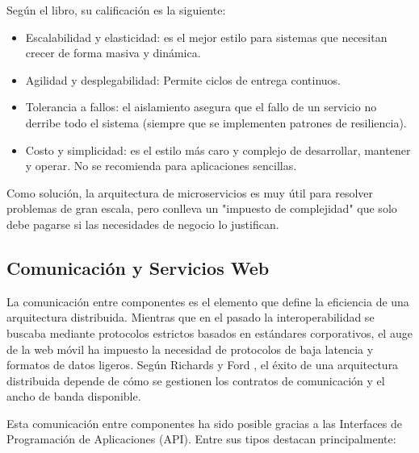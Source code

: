 \begin{itemize}
    Según el libro, su calificación es la siguiente:

    \begin{itemize}
        \item Escalabilidad y elasticidad: es el mejor estilo para sistemas que necesitan crecer de forma masiva y dinámica.
        \item Agilidad y desplegabilidad: Permite ciclos de entrega continuos.
        \item Tolerancia a fallos: el aislamiento asegura que el fallo de un servicio no derribe todo el sistema (siempre 
        que se implementen patrones de resiliencia).
        \item Costo y simplicidad: es el estilo más caro y complejo de desarrollar, mantener y operar. No se recomienda 
        para aplicaciones sencillas.
    \end{itemize}

    Como solución, la arquitectura de microservicios es muy útil para resolver problemas de gran escala, pero conlleva un "impuesto de 
    complejidad" que solo debe pagarse si las necesidades de negocio lo justifican.
\end{itemize}

\subsection{Comunicación y Servicios Web}

La comunicación entre componentes es el elemento que define la eficiencia de una arquitectura distribuida. Mientras que 
en el pasado la interoperabilidad se buscaba mediante protocolos estrictos basados en estándares corporativos, el
auge de la web móvil ha impuesto la necesidad de protocolos de baja latencia y formatos de datos ligeros. Según Richards 
y Ford \cite{libroArquitecturasSoftware}, el éxito de una arquitectura distribuida depende de cómo se gestionen los 
contratos de comunicación y el ancho de banda disponible.

Esta comunicación entre componentes ha sido posible gracias a las Interfaces de Programación de Aplicaciones (API). Entre
sus tipos destacan principalmente:

